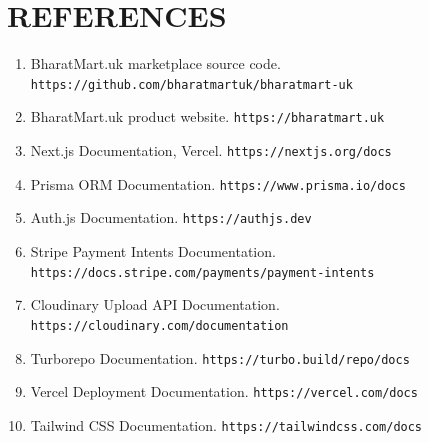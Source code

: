 \documentclass[12pt,a4paper]{report}
\begin{document}
\chapter*{REFERENCES}

\begin{enumerate}

    \item BharatMart.uk marketplace source code.
    \\
    \texttt{https://github.com/bharatmartuk/bharatmart-uk}

    \item BharatMart.uk product website.
    \texttt{https://bharatmart.uk}

    \item Next.js Documentation, Vercel.
    \texttt{https://nextjs.org/docs}

    \item Prisma ORM Documentation.
    \texttt{https://www.prisma.io/docs}

    \item Auth.js Documentation.
    \texttt{https://authjs.dev}

    \item Stripe Payment Intents Documentation.\\
    \texttt{https://docs.stripe.com/payments/payment-intents}

    \item Cloudinary Upload API Documentation.\\
    \texttt{https://cloudinary.com/documentation}

    \item Turborepo Documentation.
    \texttt{https://turbo.build/repo/docs}

    \item Vercel Deployment Documentation.
    \texttt{https://vercel.com/docs}

    \item Tailwind CSS Documentation.
    \texttt{https://tailwindcss.com/docs}

\end{enumerate}
\end{document}
